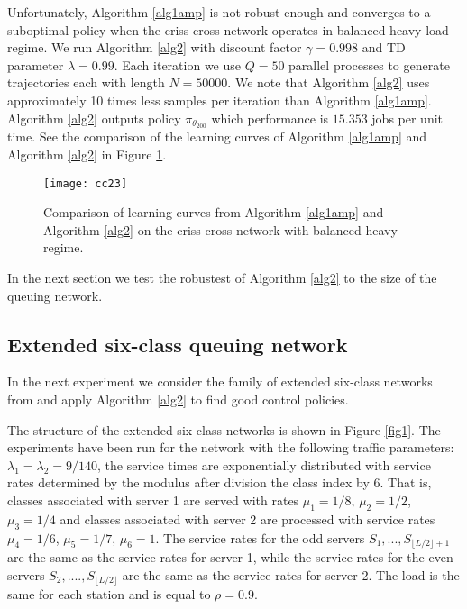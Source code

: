 \documentclass[11pt]{article}
\theoremstyle{definition}
\numberwithin{equation}{section}
\begin{document}
Unfortunately, Algorithm \ref{alg1amp} is not robust enough and converges to a  suboptimal policy when the criss-cross network operates in balanced heavy load regime.    We run Algorithm \ref{alg2} with discount factor $\gamma=0.998$ and TD parameter $\lambda = 0.99$. Each iteration we use $Q = 50$ parallel processes to generate trajectories each with length $N=50000.$ We note that Algorithm \ref{alg2} uses approximately 10 times less samples per iteration than  Algorithm \ref{alg1amp}. Algorithm \ref{alg2} outputs policy $\pi_{\theta_{200}}$ which performance is $15.353$ jobs per unit time. See the comparison of the learning curves of Algorithm \ref{alg1amp} and Algorithm \ref{alg2} in Figure \ref{fig:cc23}.



\begin{figure}[H]
\centering%
\texttt{[image: cc23]}
\caption[]{Comparison of learning curves from Algorithm \ref{alg1amp} and Algorithm \ref{alg2}  on the criss-cross network with balanced heavy regime. }
\label{fig:cc23}%
\end{figure}




In the next section we test the robustest of Algorithm \ref{alg2} to the size of the queuing network.  


\subsection{Extended six-class queuing network}\label{sec:ext}

In the next experiment we consider the family of extended six-class networks from \cite{Bertsimas2015} and apply Algorithm \ref{alg2} to find good control policies.

 The structure  of the  extended six-class networks is shown in Figure \ref{fig1}.
The experiments have been run for the network with the following traffic parameters: $\lambda_1 = \lambda_2 = 9/140$, the service times are exponentially distributed with service rates determined  by the modulus after division the class index  by 6. That is, classes associated with server 1 are served with rates $\mu_1 = 1/8$, $\mu_2 = 1/2$, $\mu_3 = 1/4$ and classes associated with server 2 are processed with service rates $\mu_4 = 1/6$, $\mu_5 = 1/7$, $\mu_6 = 1.$  The service rates
for the odd servers $S_1, ..., S_{\lfloor L/2\rfloor+1}$ are the same as the service rates for server 1, while the service rates for the even
servers $S_2, ...., S_{\lfloor L/2 \rfloor}$ are the same as the service rates for server 2. The load is the same for each station and is equal to $\rho = 0.9$.
\end{document}
